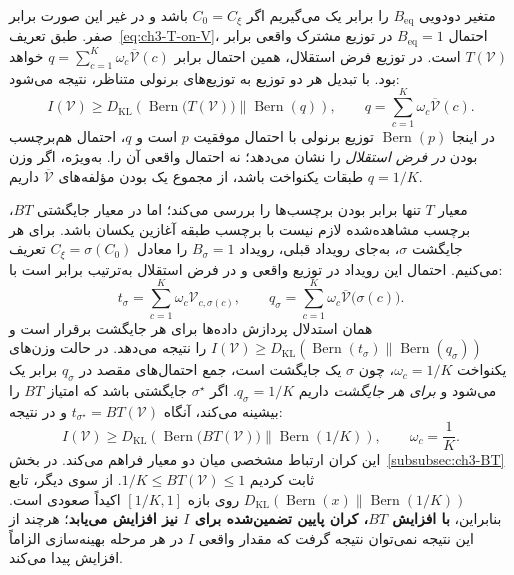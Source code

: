 متغیر دودویی $B_{\mathrm{eq}}$ را برابر یک می‌گیریم اگر $C_0=C_\xi$ باشد و در غیر این صورت برابر صفر. طبق تعریف~\eqref{eq:ch3-T-on-V}، احتمال $B_{\mathrm{eq}}=1$ در توزیع مشترک واقعی برابر $T(\mathcal V)$ است. در توزیع فرض استقلال، همین احتمال برابر $q=\sum_{c=1}^{K}\omega_c\overline{\mathcal V}(c)$ خواهد بود. با تبدیل هر دو توزیع به توزیع‌های برنولی متناظر، نتیجه می‌شود:
\begin{equation}\label{eq:ch3-I-vs-T}
\boxed{
I(\mathcal V)\ge
D_{\mathrm{KL}}\!\left(
\operatorname{Bern}\bigl(T(\mathcal V)\bigr)
\middle\|
\operatorname{Bern}(q)
\right),\qquad
q=\sum_{c=1}^{K}\omega_c\overline{\mathcal V}(c).
}
\end{equation}
در اینجا $\operatorname{Bern}(p)$ توزیع برنولی با احتمال موفقیت $p$ است و $q$، احتمال هم‌برچسب بودن \emph{در فرض استقلال} را نشان می‌دهد؛ نه احتمال واقعی آن را. به‌ویژه، اگر وزن طبقات یکنواخت باشد، از مجموع یک بودن مؤلفه‌های $\overline{\mathcal V}$ داریم $q=1/K$.

معیار $T$ تنها برابر بودن برچسب‌ها را بررسی می‌کند؛ اما در معیار جایگشتی $BT$، برچسب مشاهده‌شده لازم نیست با برچسب طبقه آغازین یکسان باشد. برای هر جایگشت $\sigma$، به‌جای رویداد قبلی، رویداد $B_\sigma=1$ را معادل $C_\xi=\sigma(C_0)$ تعریف می‌کنیم. احتمال این رویداد در توزیع واقعی و در فرض استقلال به‌ترتیب برابر است با:
\begin{equation}\label{eq:ch3-I-BT-event-probs}
t_\sigma=\sum_{c=1}^{K}\omega_c\mathcal V_{c,\sigma(c)},
\qquad
q_\sigma=\sum_{c=1}^{K}\omega_c\overline{\mathcal V}\bigl(\sigma(c)\bigr).
\end{equation}
همان استدلال پردازش داده‌ها برای هر جایگشت برقرار است و $I(\mathcal V)\ge D_{\mathrm{KL}}(\operatorname{Bern}(t_\sigma)\|\operatorname{Bern}(q_\sigma))$ را نتیجه می‌دهد. در حالت وزن‌های یکنواخت $\omega_c=1/K$، چون $\sigma$ یک جایگشت است، جمع احتمال‌های مقصد در $q_\sigma$ برابر یک می‌شود و \emph{برای هر جایگشت} داریم $q_\sigma=1/K$. اگر $\sigma^\star$ جایگشتی باشد که امتیاز $BT$ را بیشینه می‌کند، آنگاه $t_{\sigma^\star}=BT(\mathcal V)$ و در نتیجه:
\begin{equation}\label{eq:ch3-I-vs-BT}
\boxed{
I(\mathcal V)\ge
D_{\mathrm{KL}}\!\left(
\operatorname{Bern}\bigl(BT(\mathcal V)\bigr)
\middle\|
\operatorname{Bern}(1/K)
\right),\qquad \omega_c=\frac{1}{K}.
}
\end{equation}
این کران ارتباط مشخصی میان دو معیار فراهم می‌کند. در بخش~\ref{subsubsec:ch3-BT} ثابت کردیم $1/K\le BT(\mathcal V)\le1$. از سوی دیگر، تابع $D_{\mathrm{KL}}(\operatorname{Bern}(x)\|\operatorname{Bern}(1/K))$ روی بازه $[1/K,1]$ اکیداً صعودی است. بنابراین، \textbf{با افزایش $BT$، کران پایین تضمین‌شده برای $I$ نیز افزایش می‌یابد}؛ هرچند از این نتیجه نمی‌توان نتیجه گرفت که مقدار واقعی $I$ در هر مرحله بهینه‌سازی الزاماً افزایش پیدا می‌کند.

